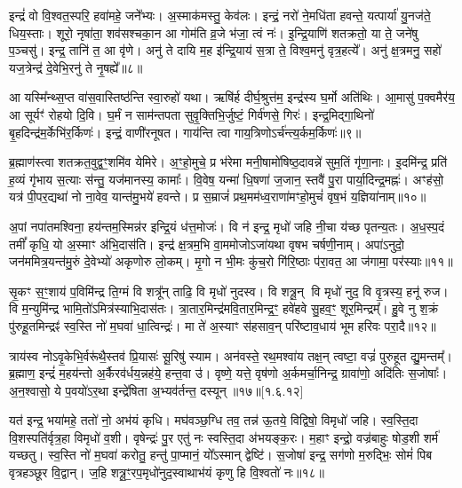 इन्द्रं॑ वो वि॒श्वत॒स्परि॒ हवा॑महे॒ जने᳚भ्यः। अ॒स्माक॑मस्तु॒ केव॑लः। इन्द्रं॒ नरो॑ ने॒मधि॑ता हवन्ते॒ यत्पार्या॑ यु॒नज॑ते॒ धिय॒स्ताः। शूरो॒ नृषा॑ता॒ शव॑सश्चका॒न आ गोम॑ति व्र॒जे भ॑जा॒ त्वं नः॑। इ॒न्द्रि॒याणि॑ शतक्रतो॒ या ते॒ जने॑षु प॒ञ्चसु॑। इन्द्र॒ तानि॑ त॒ आ वृ॑णे। अनु॑ ते दायि म॒ह इ॑न्द्रि॒याय॑ स॒त्रा ते॒ विश्व॒मनु॑ वृत्र॒हत्ये᳚। अनु॑ क्ष॒त्रमनु॒ सहो॑ यज॒त्रेन्द्र॑ दे॒वेभि॒रनु॑ ते नृ॒षह्ये᳚॥८॥

आ यस्मि᳚न्थ्स॒प्त वा॑स॒वास्तिष्ठ॑न्ति स्वा॒रुहो॑ यथा। ऋषि॑र्\mbox{}ह दीर्घ॒श्रुत्त॑म॒ इन्द्र॑स्य घ॒र्मो अति॑थिः। आ॒मासु॑ प॒क्वमैर॑य॒ आ सूर्यꣳ॑ रोहयो दि॒वि। घ॒र्मं न साम॑न्तपता सुवृ॒क्तिभि॒र्जुष्टं॒ गिर्व॑णसे॒ गिरः॑। इन्द्र॒मिद्गा॒थिनो॑ बृ॒हदिन्द्र॑म॒र्केभि॑र॒र्किणः॑। इन्द्रं॒ वाणी॑रनूषत। गाय॑न्ति त्वा गाय॒त्रिणोऽर्च॑न्त्य॒र्कम॒र्किणः॑॥९॥

 ब्र॒ह्माण॑स्त्वा शतक्रत॒वुद्व॒ꣳ॒शमि॑व येमिरे। अ॒ꣳ॒हो॒मुचे॒ प्र भ॑रेमा मनी॒षामो॑षिष्ठ॒दावन्ने॑ सुम॒तिं गृ॑णा॒नाः। इ॒दमि॑न्द्र॒ प्रति॑ ह॒व्यं गृ॑भाय स॒त्याः स॑न्तु॒ यज॑मानस्य॒ कामाः᳚। वि॒वेष॒ यन्मा॑ धि॒षणा॑ ज॒जान॒ स्तवै॑ पु॒रा पार्या॒दिन्द्र॒मह्नः॑। अꣳह॑सो॒ यत्र॑ पी॒पर॒द्यथा॑ नो ना॒वेव॒ यान्त॑मु॒भये॑ हवन्ते। प्र स॒म्राजं॑ प्रथ॒मम॑ध्व॒राणा॑मꣳहो॒मुचं॑ वृष॒भं य॒ज्ञिया॑नाम्॥१०॥
 
अ॒पां नपा॑तमश्विना॒ हय॑न्तम॒स्मिन्न॑र इन्द्रि॒यं ध॑त्त॒मोजः॑। वि न॑ इन्द्र॒ मृधो॑ जहि नी॒चा य॑च्छ पृतन्य॒तः। अ॒ध॒स्प॒दं तमीं᳚ कृधि॒ यो अ॒स्माꣳ अ॑भि॒दास॑ति। इन्द्र॑ क्ष॒त्रम॒भि वा॒ममोजोऽजा॑यथा वृषभ चर्\mbox{}षणी॒नाम्। अपा॑ऽनुदो॒ जन॑ममित्र॒यन्त॑मु॒रुं दे॒वेभ्यो॑ अकृणोरु लो॒कम्। मृ॒गो न भी॒मः कु॑च॒रो गि॑रि॒ष्ठाः प॑रा॒वत॒ आ ज॑गामा॒ पर॑स्याः॥११॥
 
   सृ॒कꣳ स॒ꣳ॒शाय॑ प॒विमि॑न्द्र ति॒ग्मं वि शत्रू᳚न् ताढि॒ वि मृधो॑ नुदस्व। वि शत्रू॒न् वि मृधो॑ नुद॒ वि वृ॒त्रस्य॒ हनू॑ रुज। वि म॒न्युमि॑न्द्र भामि॒तो॑ऽमित्र॑स्याभि॒दास॑तः। त्रा॒तार॒मिन्द्र॑मवि॒तार॒मिन्द्र॒ꣳ॒ हवे॑हवे सु॒हव॒ꣳ॒ शूर॒मिन्द्रम्᳚। हु॒वे नु श॒क्रं पु॑रुहू॒तमिन्द्रꣴ॑ स्व॒स्ति नो॑ म॒घवा॑ धा॒त्विन्द्रः॑। मा ते॑ अ॒स्याꣳ स॑हसाव॒न् परि॑ष्टाव॒धाय॑ भूम हरिवः परा॒दै॥१२॥ 
   
   त्राय॑स्व नोऽवृ॒केभि॒र्वरू॑थै॒स्तव॑ प्रि॒यासः॑ सू॒रिषु॑ स्याम। अन॑वस्ते॒ रथ॒मश्वा॑य तक्ष॒न् त्वष्टा॒ वज्रं॑ पुरुहूत द्यु॒मन्तम्᳚। ब्र॒ह्माण॒ इन्द्रं॑ म॒हय॑न्तो अ॒र्कैरव॑र्धय॒न्नह॑ये॒ हन्त॒वा उ॑। वृष्णे॒ यत्ते॒ वृष॑णो अ॒र्कमर्चा॒निन्द्र॒ ग्रावा॑णो॒ अदि॑तिः स॒जोषाः᳚। अ॒न॒श्वासो॒ ये प॒वयो॑ऽर॒था इन्द्रे॑षिता अ॒भ्यव॑र्तन्त॒ दस्यून्॥१७॥[१.६.१२]


यत॑ इन्द्र॒ भया॑महे॒ ततो॑ नो॒ अभ॑यं कृधि।
मघ॑वञ्छ॒ग्धि तव॒ तन्न॑ ऊ॒तये॒ विद्विषो॒ विमृधो॑ जहि।
स्व॒स्ति॒दा वि॒शस्पति॑र्वृत्र॒हा विमृधो॑ व॒शी।
वृषेन्द्रः॑ पु॒र एतु॑ नः स्वस्ति॒दा अ॑भयङ्क॒रः।
म॒हाꣳ इन्द्रो॒ वज्र॑बाहुः षोड॒शी शर्म॑ यच्छतु।
स्व॒स्ति नो॑ म॒घवा॑ करोतु॒ हन्तु॑ पा॒प्मानं॒ यो᳚ऽस्मान्‌ द्वेष्टि॑।
स॒जोषा॑ इन्द्र॒ सग॑णो म॒रुद्भिः॒ सोमं॑ पिब वृत्रहञ्छूर वि॒द्वान्‌।
ज॒हि शत्रू॒ꣳ॒रप॒मृधो॑नुद॒स्वाथाभ॑यं कृणु हि वि॒श्वतो॑ नः॥१८॥

